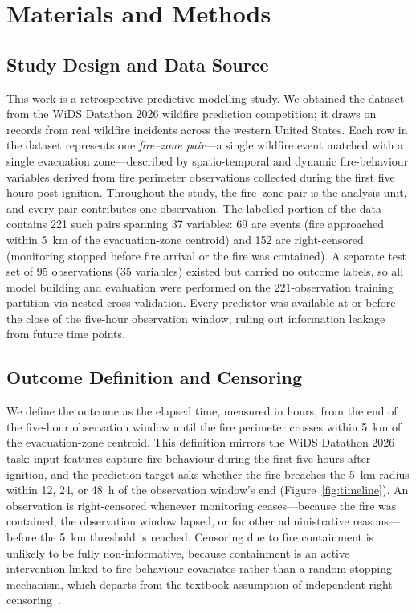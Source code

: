 \documentclass[fire,article,submit,pdftex]{../Definitions/mdpi}
\begin{document}
\section{Materials and Methods}\label{sec:methods}

\subsection{Study Design and Data Source}\label{sec:data}

This work is a retrospective predictive modelling study.
We obtained the dataset from the WiDS Datathon 2026 wildfire prediction competition; it draws on records from real wildfire incidents across the western United States.
Each row in the dataset represents one \emph{fire--zone pair}---a single wildfire event matched with a single evacuation zone---described by spatio-temporal and dynamic fire-behaviour variables derived from fire perimeter observations collected during the first five hours post-ignition.
Throughout the study, the fire--zone pair is the analysis unit, and every pair contributes one observation.
The labelled portion of the data contains 221 such pairs spanning 37 variables: 69 are events (fire approached within 5~km of the evacuation-zone centroid) and 152 are right-censored (monitoring stopped before fire arrival or the fire was contained).
A separate test set of 95 observations (35 variables) existed but carried no outcome labels, so all model building and evaluation were performed on the 221-observation training partition via nested cross-validation.
Every predictor was available at or before the close of the five-hour observation window, ruling out information leakage from future time points.

\subsection{Outcome Definition and Censoring}\label{sec:outcome}

We define the outcome as the elapsed time, measured in hours, from the end of the five-hour observation window until the fire perimeter crosses within 5~km of the evacuation-zone centroid.
This definition mirrors the WiDS Datathon 2026 task: input features capture fire behaviour during the first five hours after ignition, and the prediction target asks whether the fire breaches the 5~km radius within 12, 24, or 48~h of the observation window's end (Figure~\ref{fig:timeline}).
An observation is right-censored whenever monitoring ceases---because the fire was contained, the observation window lapsed, or for other administrative reasons---before the 5~km threshold is reached.
Censoring due to fire containment is unlikely to be fully non-informative, because containment is an active intervention linked to fire behaviour covariates rather than a random stopping mechanism, which departs from the textbook assumption of independent right censoring~\cite{Steyerberg2019}.
\end{document}
